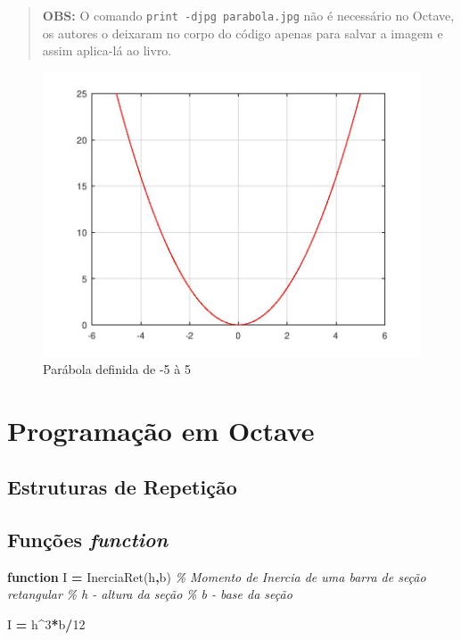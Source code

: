\documentclass[
]{book}
\newenvironment{Shaded}{\begin{snugshade}}{\end{snugshade}}
\newcommand{\BuiltInTok}[1]{#1}
\newcommand{\CommentTok}[1]{\textcolor[rgb]{0.56,0.35,0.01}{\textit{#1}}}
\newcommand{\ControlFlowTok}[1]{\textcolor[rgb]{0.13,0.29,0.53}{\textbf{#1}}}
\newcommand{\FloatTok}[1]{\textcolor[rgb]{0.00,0.00,0.81}{#1}}
\newcommand{\NormalTok}[1]{#1}
\newcommand{\OperatorTok}[1]{\textcolor[rgb]{0.81,0.36,0.00}{\textbf{#1}}}
\begin{document}
\begin{quote}
\textbf{OBS:} O comando \texttt{print\ -djpg\ parabola.jpg} não é necessário no Octave, os autores o deixaram no corpo do código apenas para salvar a imagem e assim aplica-lá ao livro.
\end{quote}

\begin{figure}

{\centering \includegraphics[width=0.5\linewidth]{parabola} 

}

\caption{Parábola definida de -5 à 5}\label{fig:unnamed-chunk-6}
\end{figure}

\hypertarget{programauxe7uxe3o-em-octave}{%
\section{Programação em Octave}\label{programauxe7uxe3o-em-octave}}

\hypertarget{estruturas-de-repetiuxe7uxe3o}{%
\subsection{Estruturas de Repetição}\label{estruturas-de-repetiuxe7uxe3o}}

\hypertarget{funuxe7uxf5es-function}{%
\subsection{\texorpdfstring{Funções \emph{function}}{Funções function}}\label{funuxe7uxf5es-function}}

\begin{Shaded}
\begin{Highlighting}[]
\ControlFlowTok{function} \BuiltInTok{I} \OperatorTok{=}\NormalTok{ InerciaRet(h}\OperatorTok{,}\NormalTok{b)}
\CommentTok{\% Momento de Inercia de uma barra de seção retangular}
\CommentTok{\% h {-} altura da seção}
\CommentTok{\% b {-} base da seção}

\BuiltInTok{I} \OperatorTok{=}\NormalTok{ h}\OperatorTok{\^{}}\FloatTok{3}\OperatorTok{*}\NormalTok{b}\OperatorTok{/}\FloatTok{12}
\end{Highlighting}
\end{Shaded}
\end{document}
